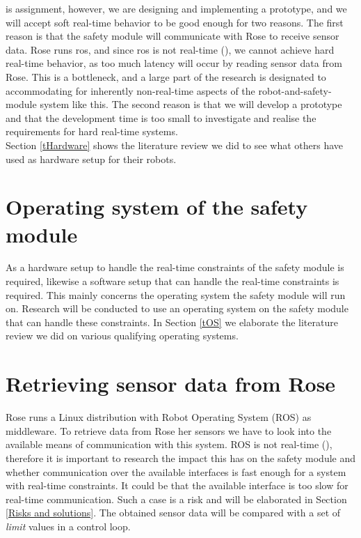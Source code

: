 \documentclass[12pt]{scrreprt}
\begin{document}
is assignment, however, we are designing and implementing a prototype, and we will accept soft real-time behavior to be good enough for two reasons. The first reason is that the safety module will communicate with Rose to receive sensor data. Rose runs \acrfull{ros}, and since \acrlong{ros} is not real-time (\cite{why_is_ros_not_realtime}), we cannot achieve hard real-time behavior, as too much latency will occur by reading sensor data from Rose. This is a bottleneck, and a large part of the research is designated to accommodating for inherently non-real-time aspects of the robot-and-safety-module system like this. The second reason is that we will develop a prototype and that the development time is too small to investigate and realise the requirements for hard real-time systems.
\\
Section \ref{tHardware} shows the literature review we did to see what others have used as hardware setup for their robots.



\section{Operating system of the safety module}
As a hardware setup to handle the real-time constraints of the safety module is required, likewise a software setup that can handle the real-time constraints is required. This mainly concerns the operating system the safety module will run on. Research will be conducted to use an operating system on the safety module that can handle these constraints. In Section \ref{tOS} we elaborate the literature review we did on various qualifying operating systems.


\section{Retrieving sensor data from Rose}
\label{Retrieving sensor data from Rose}
Rose runs a Linux distribution with Robot Operating System (ROS) as middleware. To retrieve data from Rose her sensors we have to look into the available means of communication with this system. ROS is not real-time (\cite{why_is_ros_not_realtime}), therefore it is important to research the impact this has on the safety module and whether communication over the available interfaces is fast enough for a system with real-time constraints. It could be that the available interface is too slow for real-time communication. Such a case is a risk and will be elaborated in Section \ref{Risks and solutions}. The obtained sensor data will be compared with a set of \textit{limit} values in a control loop.
\end{document}
